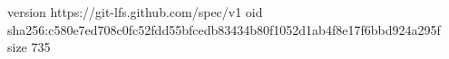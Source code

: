 version https://git-lfs.github.com/spec/v1
oid sha256:c580e7ed708c0fc52fdd55bfcedb83434b80f1052d1ab4f8e17f6bbd924a295f
size 735
